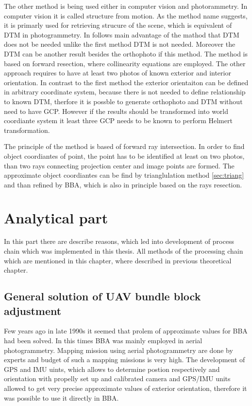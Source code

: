\documentclass[a4paper,12pt]{report}
\begin{document}
The other method is being used either in computer vision and photorammetry. In computer vision 
it is called structure from motion. As the method name suggests, it is primarly used for retrieving
strucure of the scene, which is equivalent of DTM in photogrammetry. In follows main advantage 
of the mathod that DTM does not be needed unlike the first method DTM is not needed. Moreover 
the DTM can be another result besides the orthophoto if this method. The method is based 
on forward resection, where collinearity equations are employed. The other approach requires to have at least
two photos of known exterior and interior orientation. In contrast to the first method the exterior orientaiton
can be defined in arbitrary coordinate system, because there is not needed to define relationship to 
known DTM, therfore it is possble to generate orthophoto and DTM without need to have GCP. However 
if the results should be transformed into world coordiante system it least three GCP needs to be known
to perform Helmert transformation. 

The principle of the method is based of forward ray intersection. In order to find object coordiantes
of point, the point has to be identified at least on two photos, than two rays connecting projection 
center and image points are formed. The approximate object coordiantes can be find by trianglulation 
method \ref{sec:triang} and than refined by BBA, which is also in principle based on the rays 
resection.
 

\chapter{Analytical part}

In this part there are describe reasons, which led into development of process chain which was implemented in 
this thesis. All methods of the processing chain which are mentioned in this chapter, where described in 
previous theoretical chapter.

\section{General solution of UAV bundle block adjustment}


Few years ago in late 1990s it seemed that prolem of approximate values for BBA had been solved. 
In this times BBA was mainly employed in aerial photogrammetry. Mapping mission using aerial 
photogrammetry are done by experts and budget of such a mapping missions is very high. 
The development of GPS and IMU uints, which allows to determine 
postion respectively and orientation with propelly set up and calibrated camera and GPS/IMU 
units allowed to get very precise approximate values of exterior orientation, therefore 
it was possible to use it directly in BBA.
\end{document}
